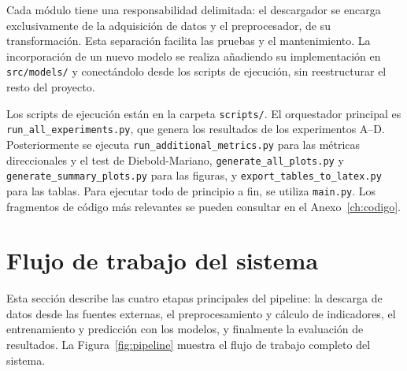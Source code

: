 Cada módulo tiene una responsabilidad delimitada: el descargador se encarga exclusivamente de la adquisición de datos y el preprocesador, de su transformación. Esta separación facilita las pruebas y el mantenimiento. La incorporación de un nuevo modelo se realiza añadiendo su implementación en \texttt{src/models/} y conectándolo desde los scripts de ejecución, sin reestructurar el resto del proyecto.

Los scripts de ejecución están en la carpeta \texttt{scripts/}. El orquestador principal es \texttt{run\_all\_\allowbreak experiments.\allowbreak py}, que genera los resultados de los experimentos A--D. Posteriormente se ejecuta \texttt{run\_additional\_\allowbreak metrics.\allowbreak py} para las métricas direccionales y el test de Diebold-Mariano, \texttt{generate\_all\_\allowbreak plots.\allowbreak py} y \texttt{generate\_\allowbreak summary\_\allowbreak plots.\allowbreak py} para las figuras, y \texttt{export\_\allowbreak tables\_\allowbreak to\_\allowbreak latex.\allowbreak py} para las tablas. Para ejecutar todo de principio a fin, se utiliza \texttt{main.py}. Los fragmentos de código más relevantes se pueden consultar en el Anexo~\ref{ch:codigo}.

\section{Flujo de trabajo del sistema}

Esta sección describe las cuatro etapas principales del pipeline: la descarga de datos desde las fuentes externas, el preprocesamiento y cálculo de indicadores, el entrenamiento y predicción con los modelos, y finalmente la evaluación de resultados. La Figura~\ref{fig:pipeline} muestra el flujo de trabajo completo del sistema.

